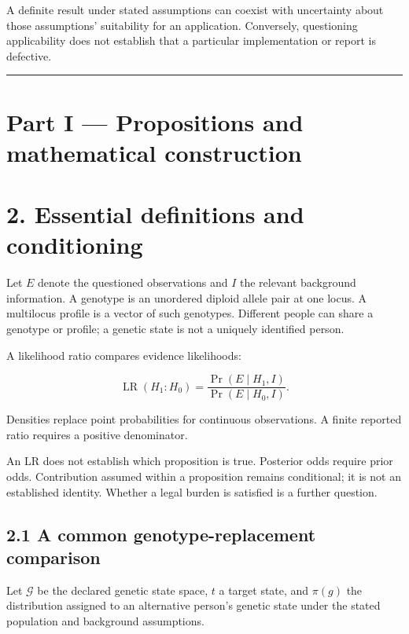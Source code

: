 \documentclass[
]{article}
\begin{document}
A definite result under stated assumptions can coexist with uncertainty
about those assumptions' suitability for an application. Conversely,
questioning applicability does not establish that a particular
implementation or report is defective.

\begin{center}\rule{0.5\linewidth}{0.5pt}\end{center}

\section{Part I --- Propositions and mathematical
construction}\label{part-i-propositions-and-mathematical-construction}

\section{2. Essential definitions and
conditioning}\label{essential-definitions-and-conditioning}

Let \(E\) denote the questioned observations and \(I\) the relevant
background information. A genotype is an unordered diploid allele pair
at one locus. A multilocus profile is a vector of such genotypes.
Different people can share a genotype or profile; a genetic state is not
a uniquely identified person.

A likelihood ratio compares evidence likelihoods:

\[
\operatorname{LR}(H_1:H_0)
=
\frac{\Pr(E\mid H_1,I)}
{\Pr(E\mid H_0,I)}.
\]

Densities replace point probabilities for continuous observations. A
finite reported ratio requires a positive denominator.

An LR does not establish which proposition is true. Posterior odds
require prior odds. Contribution assumed within a proposition remains
conditional; it is not an established identity. Whether a legal burden
is satisfied is a further question.

\subsection{2.1 A common genotype-replacement
comparison}\label{a-common-genotype-replacement-comparison}

Let \(\mathcal G\) be the declared genetic state space, \(t\) a target
state, and \(\pi(g)\) the distribution assigned to an alternative
person's genetic state under the stated population and background
assumptions.
\end{document}
